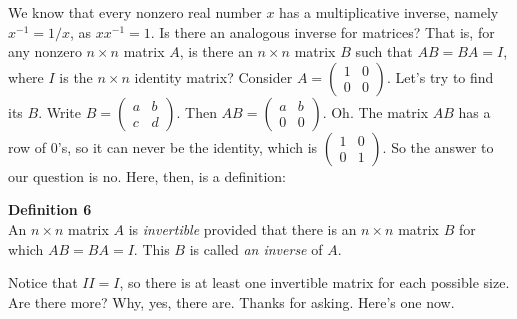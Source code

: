 \documentclass[12pt]{article}
\def\Idd{\begin{pmatrix} 1 & 0 \\ 0 & 1 \end{pmatrix}}
\begin{document}
We know that every nonzero real number $x$ has a multiplicative inverse, namely $x^{-1} = 1/x$, as $x x^{-1} = 1$. Is there an analogous inverse for matrices? That is, for any nonzero $n \times n$ matrix $A$, is there an $n
\times n$ matrix $B$ such that $AB = BA = I$, where $I$ is the $n \times n$ identity matrix? Consider $A = \begin{pmatrix} 1 & 0 \\ 0 & 0 \end{pmatrix}$. Let's try to find its $B$. Write $B = \begin{pmatrix} a & b \\ c & d \end{pmatrix}$. Then $AB = \begin{pmatrix} a & b \\ 0 & 0 \end{pmatrix}$. Oh. The matrix $AB$ has a row of $0$'s, so it can never be the identity, which is $\Idd$. So the answer to our question is no. Here, then, is a definition:

\begin{framed}
{\bf Definition 6} \\
An $n \times n$ matrix $A$ is {\itshape invertible} provided that there is an $n \times n$ matrix $B$ for which $AB = BA = I$. This $B$ is called {\itshape an inverse} of $A$.
\end{framed}

Notice that $II = I$, so there is at least one invertible matrix for each possible size. Are there more? Why, yes, there are. Thanks for asking. Here's one now.
\end{document}

